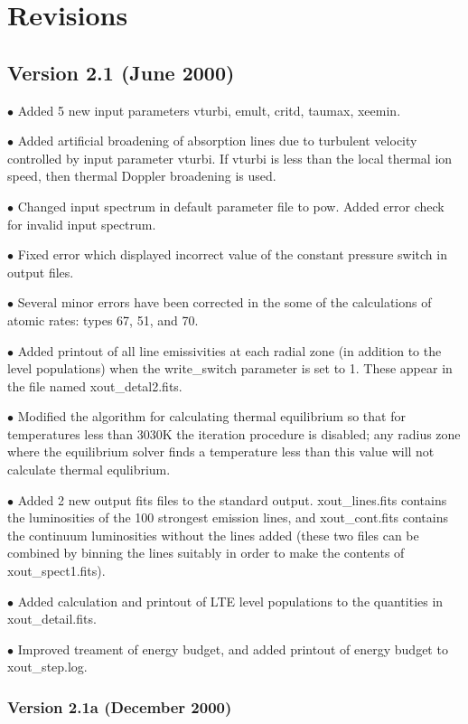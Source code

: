 \chapter{Revisions}

\section{Version 2.1 (June 2000)}

$\bullet$ Added 5 new input parameters vturbi, emult, critd, taumax, xeemin.

$\bullet$ Added artificial broadening of absorption lines due to 
turbulent velocity controlled by input parameter vturbi.  If vturbi
is less than the local thermal ion speed, then thermal Doppler 
broadening is used.

$\bullet$ Changed input spectrum in default parameter file to pow.  
Added error check for invalid input spectrum.

$\bullet$ Fixed error which displayed incorrect value of 
the constant pressure switch in output files.

$\bullet$ Several minor errors have been corrected in the some of the 
calculations of atomic rates:  types 67, 51, and 70.

$\bullet$ Added printout of all line 
emissivities at each radial zone (in addition to the level populations) 
when the write\_switch parameter is set to 1.  These appear in the file 
named xout\_detal2.fits.

$\bullet$ Modified the algorithm for calculating thermal equilibrium
so that for temperatures less than 3030K the iteration procedure is 
disabled; any radius zone where the equilibrium solver finds a temperature
less than this value will not calculate thermal equlibrium.

$\bullet$ Added 2 new output fits files to the standard output.  xout\_lines.fits
contains the luminosities of the 100 strongest emission lines, and 
xout\_cont.fits contains the continuum luminosities without the lines added
(these two files can be combined by binning the lines suitably in order 
to make the contents of xout\_spect1.fits).

$\bullet$ Added calculation and printout of LTE level populations to the quantities
in xout\_detail.fits.

$\bullet$ Improved treament of energy budget, and added printout of energy budget 
to xout\_step.log.

\subsection{Version 2.1a (December 2000)}

